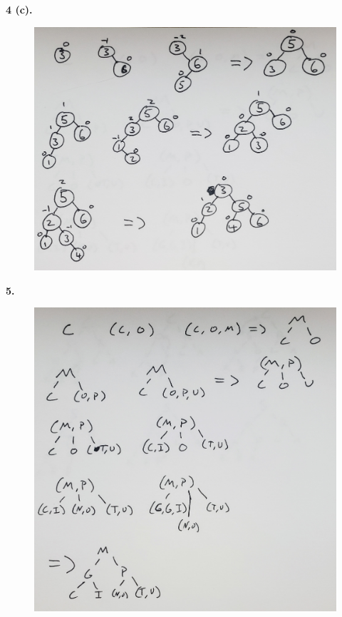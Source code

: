 \documentclass[letterpaper, 11pt]{article}
\newcommand{\hwnumber}[1]{\newpage \noindent\textbf{#1.} \smallskip}
\begin{document}
\hwnumber{4 (c)}
\begin{figure}[h!]
  \centering
  \includegraphics[width=\linewidth]{pics/num4_c.jpg}
\end{figure}

\hwnumber{5}
\begin{figure}[h!]
  \centering
  \includegraphics[width=\linewidth]{pics/num_5.jpg}
\end{figure}
\end{document}

